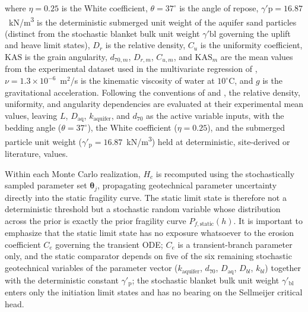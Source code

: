 where $\eta = 0.25$ is the White coefficient, $\theta = 37^\circ$ is the angle of repose, $\gamma'\mathrm{p} = 16.87$~kN/m\textsuperscript{3} is the deterministic submerged unit weight of the aquifer sand particles (distinct from the stochastic blanket bulk unit weight $\gamma'\mathrm{bl}$ governing the uplift and heave limit states), $D_r$ is the relative density, $C_u$ is the uniformity coefficient, $\mathrm{KAS}$ is the grain angularity, $d_{70,m}$, $D_{r,m}$, $C_{u,m}$, and $\mathrm{KAS}_m$ are the mean values from the experimental dataset used in the multivariate regression of \textcite{sellmeijer_2011}, $\nu = 1.3 \times 10^{-6}$~m$^2$/s is the kinematic viscosity of water at $10^\circ$C, and $g$ is the gravitational acceleration. Following the conventions of \textcite{sellmeijer_2011} and \textcite{pol_sie_2024}, the relative density, uniformity, and angularity dependencies are evaluated at their experimental mean values, leaving $L$, $D_\mathrm{aq}$, $k_\mathrm{aquifer}$, and $d_{70}$ as the active variable inputs, with the bedding angle ($\theta = 37^\circ$), the White coefficient ($\eta = 0.25$), and the submerged particle unit weight ($\gamma'_\mathrm{p} = 16.87$~kN/m\textsuperscript{3}) held at deterministic, site-derived or literature, values.

Within each Monte Carlo realization, $H_c$ is recomputed using the stochastically sampled parameter set $\boldsymbol{\theta}_j$, propagating geotechnical parameter uncertainty directly into the static fragility curve. The static limit state is therefore not a deterministic threshold but a stochastic random variable whose distribution across the prior is exactly the prior fragility curve $P_{f,\mathrm{static}}(h)$. It is important to emphasize that the static limit state has no exposure whatsoever to the erosion coefficient $C_e$ governing the transient ODE; $C_e$ is a transient-branch parameter only, and the static comparator depends on five of the six remaining stochastic geotechnical variables of the parameter vector ($k_\mathrm{aquifer}$, $d_{70}$, $D_\mathrm{aq}$, $D_{bl}$, $k_{bl}$) together with the deterministic constant $\gamma'_\mathrm{p}$; the stochastic blanket bulk unit weight $\gamma'_\mathrm{bl}$ enters only the initiation limit states and has no bearing on the Sellmeijer critical head.

